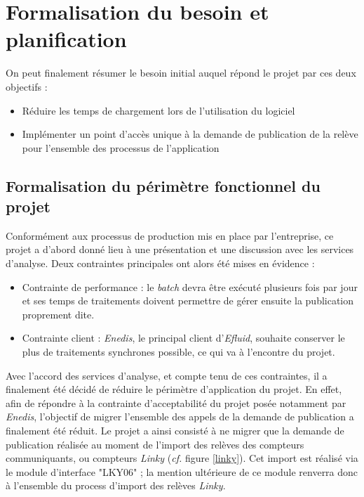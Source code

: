 \documentclass[a4paper, 12pt]{report}
\begin{document}
\section{Formalisation du besoin et planification}

On peut finalement résumer le besoin initial auquel répond le projet par ces deux objectifs :

\begin{itemize}
  \item Réduire les temps de chargement lors de l'utilisation du logiciel
  \item Implémenter un point d'accès unique à la demande de publication de la relève pour l'ensemble des processus de l'application
\end{itemize}

\subsection{Formalisation du périmètre fonctionnel du projet}

Conformément aux processus de production mis en place par l'entreprise, ce projet a d'abord donné lieu à une présentation et une discussion avec les services d'analyse. Deux contraintes principales ont alors été mises en évidence :\\

\begin{itemize}
  \item Contrainte de performance : le \textit{batch} devra être exécuté plusieurs fois par jour et ses temps de traitements doivent permettre de gérer ensuite la publication proprement dite.
  \item Contrainte client : \textit{Enedis}, le principal client d'\textit{Efluid}, souhaite conserver le plus de traitements synchrones possible, ce qui va à l'encontre du projet.
\end{itemize}
\vspace{0.5cm}

Avec l'accord des services d'analyse, et compte tenu de ces contraintes, il a finalement été décidé de réduire le périmètre d'application du projet. En effet, afin de répondre à la contrainte d'acceptabilité du projet posée notamment par \textit{Enedis}, l'objectif de migrer l'ensemble des appels de la demande de publication a finalement été réduit. Le projet a ainsi consisté à ne migrer que la demande de publication réalisée au moment de l'import des relèves des compteurs communiquants, ou compteurs \textit{Linky} (\textit{cf.} figure \ref{linky}). Cet import est réalisé via le module d'interface "LKY06" ; la mention ultérieure de ce module renverra donc à l'ensemble du process d'import des relèves \textit{Linky}.
\end{document}

